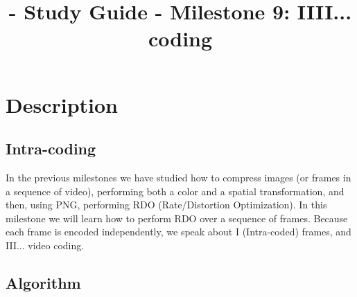 
\title{\SM{} - Study Guide - Milestone 9: IIII... coding}

\maketitle

\tableofcontents

\section{Description}

\subsection{Intra-coding}

In the previous milestones we have studied how to compress images (or
frames in a sequence of video), performing both a color and a spatial
transformation, and then, using PNG, performing RDO (Rate/Distortion
Optimization). In this milestone we will learn how to perform RDO over
a sequence of frames. Because each frame is encoded independently, we
speak about I (Intra-coded) frames, and III... video coding.

\subsection{Algorithm}

